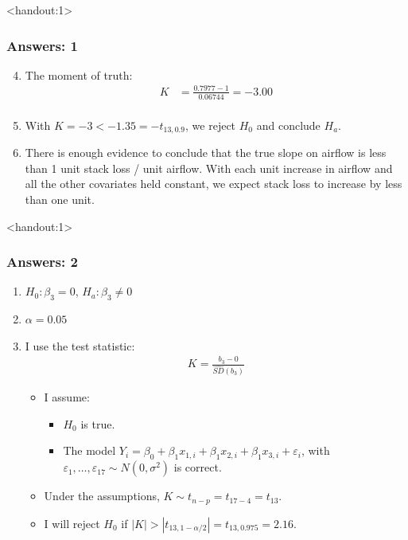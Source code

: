 \documentclass[handout]{beamer}\usepackage{graphicx, color}
\newcommand{\answers}{1}
\providecommand{\e}{\varepsilon}
\providecommand{\wh}[1]{\widehat{#1}}
\numberwithin{equation}{section}
\begin{document}
\begin{frame}<handout:\answers>
\frametitle{Answers: 1} \small
\begin{enumerate}
\setcounter{enumi}{3}
\item The moment of truth:
\pause \begin{align*}
K &= \frac{0.7977 - 1}{0.06744} = -3.00 \\
\end{align*}
\pause \item With $K = -3 <  -1.35 = -t_{13, 0.9}$, we reject $H_0$ and conclude $H_a$.
\pause \item There is enough evidence to conclude that the true slope on airflow is less than 1 unit stack loss / unit airflow. With each unit increase in airflow and all the other covariates held constant, we expect stack loss to increase by less than one unit.
\end{enumerate}
\end{frame}





\begin{frame}<handout:\answers>
\frametitle{Answers: 2}
\begin{enumerate}[1. ]
\item $H_0: \beta_3 = 0$, $H_a: \beta_3 \ne 0$
\pause \item $\alpha = 0.05$
\pause \item I use the test statistic:
\pause \begin{align*}
K = \frac{b_3 - 0}{\wh{SD}(b_3)}
\end{align*}
\begin{itemize}
\pause \item I assume:
\begin{itemize}
\pause \item $H_0$ is true.
\pause \item The model $Y_i = \beta_0 + \beta_1 x_{1, i} + \beta_1 x_{2, i} + \beta_1 x_{3, i} + \e_i$, with $\e_1, \ldots, \e_{17} \sim N(0, \sigma^2)$ is correct.
\end{itemize}
\pause \item Under the assumptions, $K \sim t_{n - p} = t_{17 - 4} = t_{13}$.
\pause \item I will reject $H_0$ if $|K| > | t_{13, 1 - \alpha/2} |= t_{13, 0.975} = 2.16$.
\end{itemize}
\end{enumerate}
\end{frame}
\end{document}
